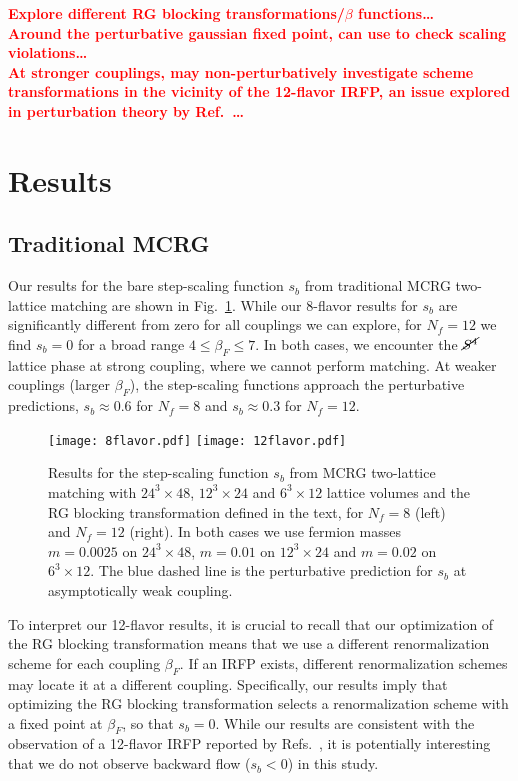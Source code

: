 \documentclass{PoS}
\newcommand{\be}{\ensuremath{\beta} }
\newcommand{\X}{\ensuremath{\!\times\!} }
\newcommand{\Sb}{\ensuremath{\cancel{S^4}} }
\newcommand{\refcite}[1]{Ref.~\cite{#1}}
\newcommand{\fig}[1]{Fig.~\ref{#1}}
\newcommand{\TODO}[1]{\textcolor{red}{{\bf #1}}}
\begin{document}
\TODO{Explore different RG blocking transformations/\be functions\dots \\
Around the perturbative gaussian fixed point, can use to check scaling violations\dots \\
At stronger couplings, may non-perturbatively investigate scheme transformations in the vicinity of the 12-flavor IRFP, an issue explored in perturbation theory by \refcite{Ryttov:2012nt}\dots}



\section{Results} %
\subsection{\label{sec:MCRGresults}Traditional MCRG} %
Our results for the bare step-scaling function $s_b$ from traditional MCRG two-lattice matching are shown in \fig{fig:MCRG}.
While our 8-flavor results for $s_b$ are significantly different from zero for all couplings we can explore, for $N_f = 12$ we find $s_b = 0$ for a broad range $4 \leq \be_F \leq 7$.
In both cases, we encounter the \Sb lattice phase at strong coupling, where we cannot perform matching.
At weaker couplings (larger $\be_F$), the step-scaling functions approach the perturbative predictions, $s_b \approx 0.6$ for $N_f = 8$ and $s_b \approx 0.3$ for $N_f = 12$.

\begin{figure}[htpb]
  \texttt{[image: 8flavor.pdf]}\hfill
  \texttt{[image: 12flavor.pdf]}
  \caption{Results for the step-scaling function $s_b$ from MCRG two-lattice matching with $24^3\X48$, $12^3\X24$ and $6^3\X12$ lattice volumes and the RG blocking transformation defined in the text, for $N_f = 8$ (left) and $N_f = 12$ (right).  In both cases we use fermion masses $m = 0.0025$ on $24^3\X48$, $m = 0.01$ on $12^3\X24$ and $m = 0.02$ on $6^3\X12$.  The blue dashed line is the perturbative prediction for $s_b$ at asymptotically weak coupling.}
  \label{fig:MCRG}
\end{figure}

To interpret our 12-flavor results, it is crucial to recall that our optimization of the RG blocking transformation means that we use a different renormalization scheme for each coupling $\be_F$.
If an IRFP exists, different renormalization schemes may locate it at a different coupling.
Specifically, our results imply that optimizing the RG blocking transformation selects a renormalization scheme with a fixed point at $\be_F$, so that $s_b = 0$.
While our results are consistent with the observation of a 12-flavor IRFP reported by Refs.~\cite{Hasenfratz:2011xn, Hasenfratz:2011np}, it is potentially interesting that we do not observe backward flow ($s_b < 0$) in this study.
\end{document}
